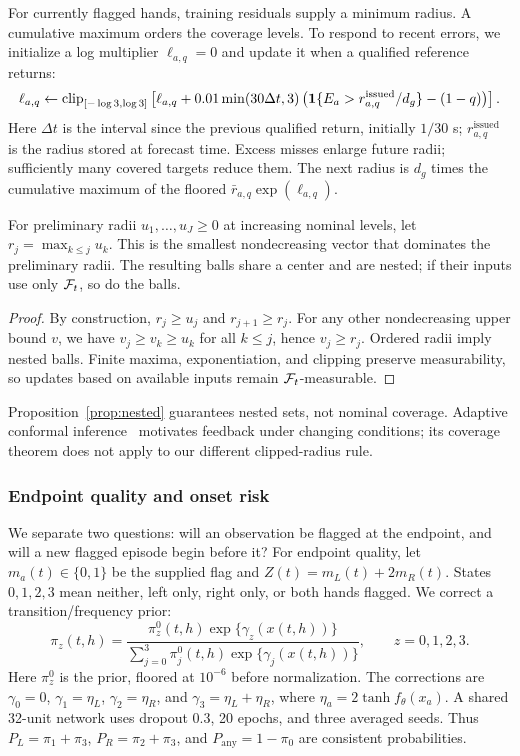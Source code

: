 For currently flagged hands, training residuals supply a minimum radius. A cumulative maximum orders the coverage levels. To respond to recent errors, we initialize a log multiplier $\ell_{a,q}=0$ and update it when a qualified reference returns:
\begin{equation}
\ell_{a,q}\leftarrow
\operatorname{clip}_{[-\log3,\log3]}
\left[\ell_{a,q}+0.01\min(30\Delta t,3)
\left(\mathbf{1}\{E_a>r^{\mathrm{issued}}_{a,q}/d_g\}-(1-q)\right)\right].
\label{eq:feedback}
\end{equation}
\noindent Here $\Delta t$ is the interval since the previous qualified return, initially $1/30$ s; $r^{\mathrm{issued}}_{a,q}$ is the radius stored at forecast time. Excess misses enlarge future radii; sufficiently many covered targets reduce them. The next radius is $d_g$ times the cumulative maximum of the floored $\bar r_{a,q}\exp(\ell_{a,q})$.

\begin{proposition}
\label{prop:nested}
For preliminary radii $u_1,\ldots,u_J\geq0$ at increasing nominal levels, let $r_j=\max_{k\leq j}u_k$. This is the smallest nondecreasing vector that dominates the preliminary radii. The resulting balls share a center and are nested; if their inputs use only $\mathcal{F}_t$, so do the balls.
\end{proposition}
\begin{proof}
By construction, $r_j\geq u_j$ and $r_{j+1}\geq r_j$. For any other nondecreasing upper bound $v$, we have $v_j\geq v_k\geq u_k$ for all $k\leq j$, hence $v_j\geq r_j$. Ordered radii imply nested balls. Finite maxima, exponentiation, and clipping preserve measurability, so updates based on available inputs remain $\mathcal{F}_t$-measurable.
\end{proof}

Proposition~\ref{prop:nested} guarantees nested sets, not nominal coverage. Adaptive conformal inference~\cite{aci} motivates feedback under changing conditions; its coverage theorem does not apply to our different clipped-radius rule.

\subsubsection{Endpoint quality and onset risk}
We separate two questions: will an observation be flagged at the endpoint, and will a new flagged episode begin before it? For endpoint quality, let $m_a(t)\in\{0,1\}$ be the supplied flag and $Z(t)=m_L(t)+2m_R(t)$. States $0,1,2,3$ mean neither, left only, right only, or both hands flagged. We correct a transition/frequency prior:
\begin{equation}
\pi_z(t,h)=
\frac{\pi_z^0(t,h)\exp\{\gamma_z(x(t,h))\}}
{\sum_{j=0}^{3}\pi_j^0(t,h)\exp\{\gamma_j(x(t,h))\}},\qquad z=0,1,2,3.
\label{eq:endpoint}
\end{equation}
\noindent Here $\pi_z^0$ is the prior, floored at $10^{-6}$ before normalization. The corrections are $\gamma_0=0$, $\gamma_1=\eta_L$, $\gamma_2=\eta_R$, and $\gamma_3=\eta_L+\eta_R$, where $\eta_a=2\tanh f_\theta(x_a)$. A shared 32-unit network uses dropout 0.3, 20 epochs, and three averaged seeds. Thus $P_L=\pi_1+\pi_3$, $P_R=\pi_2+\pi_3$, and $P_{\mathrm{any}}=1-\pi_0$ are consistent probabilities.

